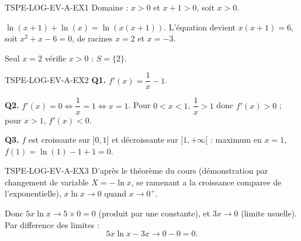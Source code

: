 \begin{corrige}{TSPE-LOG-EV-A-EX1}
Domaine : $x>0$ et $x+1>0$, soit $x>0$.

$\ln(x+1)+\ln(x) = \ln(x(x+1))$. L'équation devient $x(x+1)=6$, soit $x^2+x-6=0$, de racines $x=2$ et $x=-3$.

Seul $x=2$ vérifie $x>0$ : $S=\{2\}$.
\end{corrige}

\begin{corrige}{TSPE-LOG-EV-A-EX2}
\textbf{Q1.} $f'(x) = \dfrac{1}{x} - 1$.

\textbf{Q2.} $f'(x)=0 \iff \dfrac{1}{x}=1 \iff x=1$. Pour $0<x<1$, $\dfrac{1}{x}>1$ donc $f'(x)>0$ ; pour $x>1$, $f'(x)<0$.

\textbf{Q3.} $f$ est croissante sur $]0,1]$ et décroissante sur $[1,+\infty[$ : maximum en $x=1$, $f(1) = \ln(1)-1+1 = 0$.
\end{corrige}

\begin{corrige}{TSPE-LOG-EV-A-EX3}
D'après le théorème du cours (démonstration par changement de variable $X=-\ln x$, se ramenant a la croissance comparee de l'exponentielle), $x\ln x \to 0$ quand $x \to 0^+$.

Donc $5x\ln x \to 5 \times 0 = 0$ (produit par une constante), et $3x \to 0$ (limite usuelle). Par difference des limites :
\[
  5x\ln x - 3x \to 0 - 0 = 0.
\]
\end{corrige}
